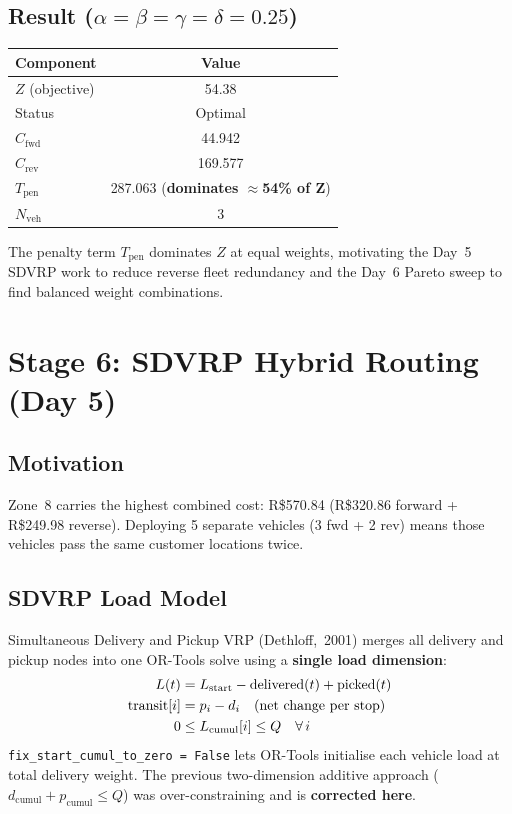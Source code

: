 \documentclass[11pt,a4paper]{article}
\begin{document}
\subsection{Result ($\alpha=\beta=\gamma=\delta=0.25$)}
\begin{tabular}{lc}
\toprule
\textbf{Component} & \textbf{Value} \\
\midrule
$Z$ (objective)    & 54.38 \\
Status             & Optimal \\
$C_{\text{fwd}}$ & 44.942 \\
$C_{\text{rev}}$ & 169.577 \\
$T_{\text{pen}}$ & 287.063 \quad (\textbf{dominates $\approx$54\% of Z}) \\
$N_{\text{veh}}$ & 3 \\
\bottomrule
\end{tabular}

The penalty term $T_{\text{pen}}$ dominates $Z$ at equal weights,
motivating the Day~5 SDVRP work to reduce reverse fleet redundancy
and the Day~6 Pareto sweep to find balanced weight combinations.

\section{Stage 6: SDVRP Hybrid Routing (Day 5)}

\subsection{Motivation}
Zone~8 carries the highest combined cost: R\$570.84 (R\$320.86 forward
+ R\$249.98 reverse).  Deploying 5 separate vehicles (3 fwd + 2 rev)
means those vehicles pass the same customer locations twice.

\subsection{SDVRP Load Model}
Simultaneous Delivery and Pickup VRP (Dethloff,~2001) merges all
delivery and pickup nodes into one OR-Tools solve using a
\textbf{single load dimension}:
\begin{align}
  L(t) &= L_{\text{start}} - \text{delivered}(t) + \text{picked}(t) \notag\\
  \text{transit}[i] &= p_i - d_i \quad \text{(net change per stop)} \notag\\
  0 &\leq L_{\text{cumul}}[i] \leq Q \quad \forall\, i \notag
\end{align}
\texttt{fix\_start\_cumul\_to\_zero = False} lets OR-Tools initialise
each vehicle load at total delivery weight.  The previous two-dimension
additive approach ($d_{\text{cumul}} + p_{\text{cumul}} \leq Q$) was
over-constraining and is \textbf{corrected here}.
\end{document}
